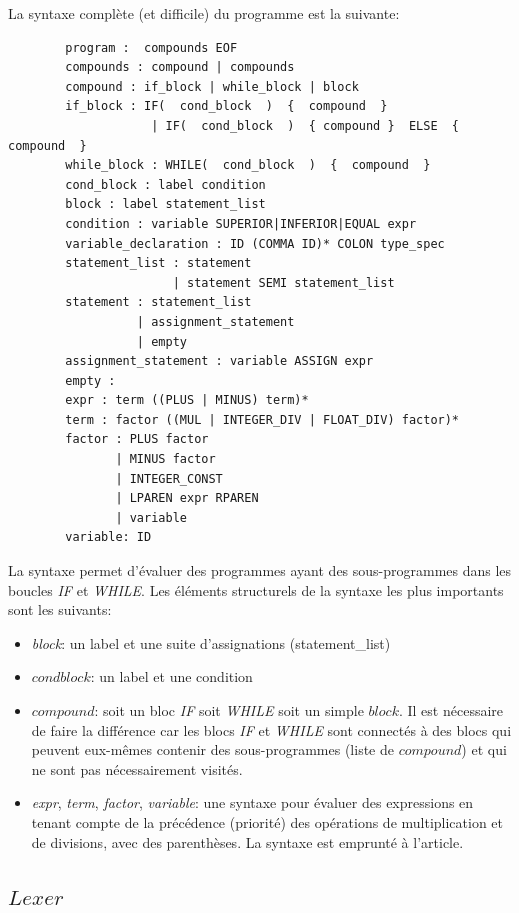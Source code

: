 \documentclass[a4paper]{article}
\begin{document}
La syntaxe complète (et difficile) du programme est la suivante: 
\begin{verbatim}
        program :  compounds EOF
        compounds : compound | compounds
        compound : if_block | while_block | block
        if_block : IF(  cond_block  )  {  compound  }
                    | IF(  cond_block  )  { compound }  ELSE  {  compound  }
        while_block : WHILE(  cond_block  )  {  compound  }
        cond_block : label condition
        block : label statement_list
        condition : variable SUPERIOR|INFERIOR|EQUAL expr
        variable_declaration : ID (COMMA ID)* COLON type_spec
        statement_list : statement
                       | statement SEMI statement_list
        statement : statement_list
                  | assignment_statement
                  | empty
        assignment_statement : variable ASSIGN expr
        empty :
        expr : term ((PLUS | MINUS) term)*
        term : factor ((MUL | INTEGER_DIV | FLOAT_DIV) factor)*
        factor : PLUS factor
               | MINUS factor
               | INTEGER_CONST
               | LPAREN expr RPAREN
               | variable
        variable: ID
\end{verbatim}
La syntaxe permet d'évaluer des programmes ayant des sous-programmes dans les boucles \textit{IF} et \textit{WHILE}. 
Les éléments structurels de la syntaxe les plus importants sont les suivants: 
\begin{itemize}
\item \textit{block}: un label et une suite d'assignations (statement\_list) 
\item $condblock$: un label et une condition
\item $compound$: soit un bloc \textit{IF} soit \textit{WHILE} soit un simple $block$. Il est nécessaire de faire la différence car les blocs \textit{IF} et \textit{WHILE} sont connectés à des blocs qui peuvent eux-mêmes contenir des sous-programmes (liste de $compound$) et qui ne sont pas nécessairement visités. 
\item \textit{expr}, \textit{term}, \textit{factor}, \textit{variable}:  une syntaxe pour évaluer des expressions en tenant compte de la précédence (priorité) des opérations de multiplication et de divisions, avec des parenthèses. La syntaxe est emprunté à l'article\cite{1}.
\end{itemize}

\subsection{$Lexer$}
\end{document}
